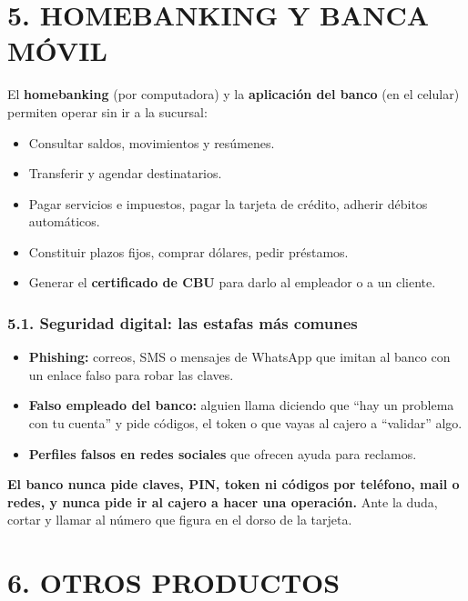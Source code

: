 \section*{5. HOMEBANKING Y BANCA MÓVIL}

El \textbf{homebanking} (por computadora) y la \textbf{aplicación del banco} (en el celular)
permiten operar sin ir a la sucursal:
\begin{itemize}
  \item Consultar saldos, movimientos y resúmenes.
  \item Transferir y agendar destinatarios.
  \item Pagar servicios e impuestos, pagar la tarjeta de crédito, adherir débitos automáticos.
  \item Constituir plazos fijos, comprar dólares, pedir préstamos.
  \item Generar el \textbf{certificado de CBU} para darlo al empleador o a un cliente.
\end{itemize}

\subsubsection*{5.1. Seguridad digital: las estafas más comunes}
\begin{itemize}
  \item \textbf{Phishing:} correos, SMS o mensajes de WhatsApp que imitan al banco con un
        enlace falso para robar las claves.
  \item \textbf{Falso empleado del banco:} alguien llama diciendo que ``hay un problema con tu
        cuenta'' y pide códigos, el token o que vayas al cajero a ``validar'' algo.
  \item \textbf{Perfiles falsos en redes sociales} que ofrecen ayuda para reclamos.
\end{itemize}
\textbf{El banco nunca pide claves, PIN, token ni códigos por teléfono, mail o redes, y nunca
pide ir al cajero a hacer una operación.} Ante la duda, cortar y llamar al número que figura
en el dorso de la tarjeta.

\section*{6. OTROS PRODUCTOS}

